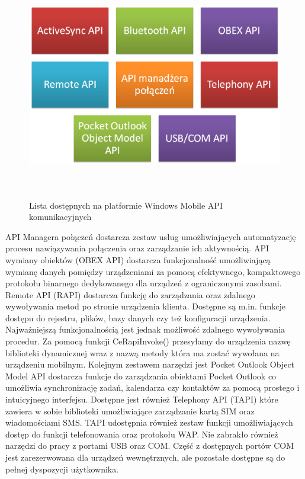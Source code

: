 \begin{figure}[h!]
 \centering
 \includegraphics[height=100mm]{../images/ch03/wm_comm_api.png}
 \caption{Lista dostępnych na platformie Windows Mobile API komunikacyjnych}
 \label{fig:WMCommunicationAPI}
\end{figure}

API Managera połączeń dostarcza zestaw usług umożliwiających automatyzację procesu
nawiązywania połączenia oraz zarządzanie ich aktywnością. API wymiany obiektów
(OBEX API) dostarcza funkcjonalność umożliwiającą wymianę danych pomiędzy
urządzeniami za pomocą efektywnego, kompaktowego protokołu binarnego
dedykowanego dla urządzeń z ograniczonymi zasobami. Remote API (RAPI) dostarcza
funkcję do zarządzania oraz zdalnego wywoływania metod po stronie
urządzenia klienta. Dostępne są m.in. funkcje dostępu do rejestru, plików, bazy
danych czy też konfiguracji urządzenia. Najważniejszą funkcjonalnością jest
jednak możliwość zdalnego wywoływania procedur. Za pomocą funkcji
CeRapiInvoke() przesyłamy do urządzenia nazwę biblioteki dynamicznej wraz z
nazwą metody która ma zostać wywołana na urządzeniu mobilnym. Kolejnym zestawem
narzędzi jest Pocket Outlook Object Model API dostarcza funkcje do zarządzania
obiektami Pocket Outlook  co umożliwia synchronizację zadań, kalendarza czy
kontaktów za pomocą prostego i intuicyjnego interfejsu. Dostępne jest również
Telephony API (TAPI) które zawiera w sobie biblioteki umożliwiające zarządzanie
kartą SIM oraz wiadomościami SMS. TAPI udostępnia również zestaw funkcji
umożliwiających dostęp do funkcji telefonowania oraz protokołu WAP. Nie
zabrakło również narzędzi do pracy z portami USB oraz COM. Część z dostępnych portów COM
jest zarezerwowana dla urządzeń wewnętrznych, ale pozostałe dostępne są do
pełnej dyspozycji użytkownika.

